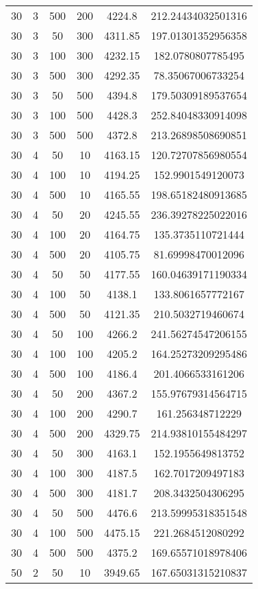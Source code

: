 {\begin{longtabu}{S
S
S
S
S[round-mode=places, round-precision=0]
S[round-mode=places, round-precision=0]}
30 & 3 & 500 & 200 & 4224.8 & 212.24434032501316 \\
30 & 3 & 50 & 300 & 4311.85 & 197.01301352956358 \\
30 & 3 & 100 & 300 & 4232.15 & 182.0780807785495 \\
30 & 3 & 500 & 300 & 4292.35 & 78.35067006733254 \\
30 & 3 & 50 & 500 & 4394.8 & 179.50309189537654 \\
30 & 3 & 100 & 500 & 4428.3 & 252.84048330914098 \\
30 & 3 & 500 & 500 & 4372.8 & 213.26898508690851 \\
30 & 4 & 50 & 10 & 4163.15 & 120.72707856980554 \\
30 & 4 & 100 & 10 & 4194.25 & 152.9901549120073 \\
30 & 4 & 500 & 10 & 4165.55 & 198.65182480913685 \\
30 & 4 & 50 & 20 & 4245.55 & 236.39278225022016 \\
30 & 4 & 100 & 20 & 4164.75 & 135.3735110721444 \\
30 & 4 & 500 & 20 & 4105.75 & 81.69998470012096 \\
30 & 4 & 50 & 50 & 4177.55 & 160.04639171190334 \\
30 & 4 & 100 & 50 & 4138.1 & 133.8061657772167 \\
30 & 4 & 500 & 50 & 4121.35 & 210.5032719460674 \\
30 & 4 & 50 & 100 & 4266.2 & 241.56274547206155 \\
30 & 4 & 100 & 100 & 4205.2 & 164.25273209295486 \\
30 & 4 & 500 & 100 & 4186.4 & 201.4066533161206 \\
30 & 4 & 50 & 200 & 4367.2 & 155.97679314564715 \\
30 & 4 & 100 & 200 & 4290.7 & 161.256348712229 \\
30 & 4 & 500 & 200 & 4329.75 & 214.93810155484297 \\
30 & 4 & 50 & 300 & 4163.1 & 152.1955649813752 \\
30 & 4 & 100 & 300 & 4187.5 & 162.7017209497183 \\
30 & 4 & 500 & 300 & 4181.7 & 208.3432504306295 \\
30 & 4 & 50 & 500 & 4476.6 & 213.59995318351548 \\
30 & 4 & 100 & 500 & 4475.15 & 221.2684512080292 \\
30 & 4 & 500 & 500 & 4375.2 & 169.65571018978406 \\
50 & 2 & 50 & 10 & 3949.65 & 167.65031315210837 \\

\end{longtabu}}
